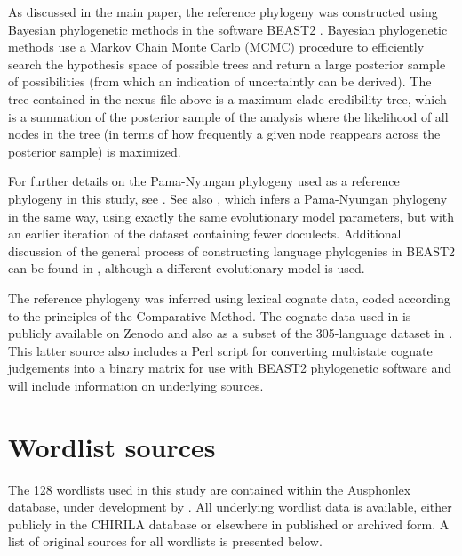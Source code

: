 As discussed in the main paper, the reference phylogeny was constructed
using Bayesian phylogenetic methods in the software BEAST2
\autocite{bouckaert_beast_2014}. Bayesian phylogenetic methods use a
Markov Chain Monte Carlo (MCMC) procedure to efficiently search the
hypothesis space of possible trees and return a large posterior sample
of possibilities (from which an indication of uncertaintly can be
derived). The tree contained in the nexus file above is a maximum clade
credibility tree, which is a summation of the posterior sample of the
\textcite{bowern_pama-nyungan_2015} analysis where the likelihood of all
nodes in the tree (in terms of how frequently a given node reappears
across the posterior sample) is maximized.

For further details on the Pama-Nyungan phylogeny used as a reference
phylogeny in this study, see \textcite{bowern_pama-nyungan_2015}. See
also \textcite{bowern_computational_2012}, which infers a Pama-Nyungan
phylogeny in the same way, using exactly the same evolutionary model
parameters, but with an earlier iteration of the dataset containing
fewer doculects. Additional discussion of the general process of
constructing language phylogenies in BEAST2 can be found in
\textcite{bouckaert_origin_2018}, although a different evolutionary
model is used.

The reference phylogeny was inferred using lexical cognate data, coded
according to the principles of the Comparative Method. The cognate data
used in \textcite{bowern_pama-nyungan_2015} is publicly available on
Zenodo \autocite{bowern_pama-nyungan_2018} and also as a subset of the
305-language dataset in \textcite{bouckaert_origin_2018}. This latter
source also includes a Perl script for converting multistate cognate
judgements into a binary matrix for use with BEAST2 phylogenetic
software and will include information on underlying sources.

\newpage

\hypertarget{wordlist-sources}{%
\section{Wordlist sources}\label{wordlist-sources}}

The 128 wordlists used in this study are contained within the Ausphonlex
database, under development by \textcite{round_ausphon-lexicon_2017}.
All underlying wordlist data is available, either publicly in the
CHIRILA database \autocite{bowern_chirila_2016} or elsewhere in
published or archived form. A list of original sources for all wordlists
is presented below.

